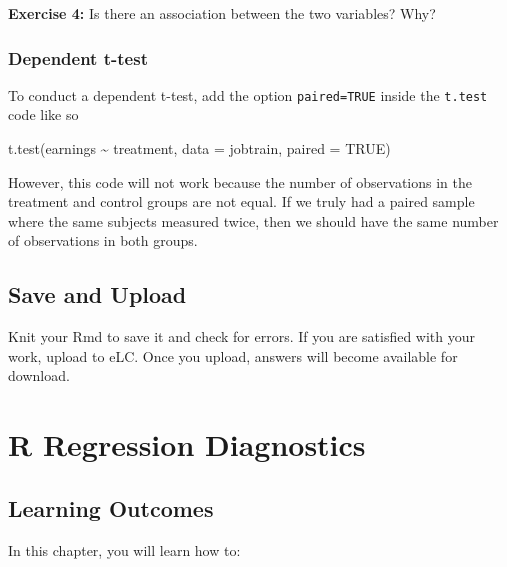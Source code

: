 \documentclass[
]{book}
\makeatletter
\newenvironment{Shaded}{\begin{snugshade}}{\end{snugshade}}
\newcommand{\AttributeTok}[1]{\textcolor[rgb]{0.61,0.61,0.61}{#1}}
\newcommand{\ConstantTok}[1]{\textcolor[rgb]{0,0,0}{#1}}
\newcommand{\FunctionTok}[1]{\textcolor[rgb]{0,0,0}{#1}}
\newcommand{\NormalTok}[1]{#1}
\newcommand{\SpecialCharTok}[1]{\textcolor[rgb]{0,0,0}{#1}}
\newenvironment{kframe}{%
\medskip{}
\setlength{\fboxsep}{.8em}
 \def\at@end@of@kframe{}%
 \ifinner\ifhmode%
  \def\at@end@of@kframe{\end{minipage}}%
  \begin{minipage}{\columnwidth}%
 \fi\fi%
 \def\FrameCommand##1{\hskip\@totalleftmargin \hskip-\fboxsep
 \colorbox{shadecolor}{##1}\hskip-\fboxsep
     \hskip-\linewidth \hskip-\@totalleftmargin \hskip\columnwidth}%
 \MakeFramed {\advance\hsize-\width
   \@totalleftmargin\z@ \linewidth\hsize
   \@setminipage}}%
 {\par\unskip\endMakeFramed%
 \at@end@of@kframe}
\renewenvironment{Shaded}{\begin{kframe}}{\end{kframe}}
\newenvironment{rmdblock}[1]
  {\begin{shaded*}
  }
  {\end{shaded*}
  }
\newenvironment{learncheck}
  {\begin{rmdblock}{warning}}
  {\end{rmdblock}}
\makeatother
\begin{document}
\begin{learncheck}
\textbf{Exercise 4:} Is there an association between the two variables?
Why?
\end{learncheck}

\hypertarget{dependent-t-test}{%
\subsection{Dependent t-test}\label{dependent-t-test}}

To conduct a dependent t-test, add the option \texttt{paired=TRUE} inside the \texttt{t.test} code like so

\begin{Shaded}
\begin{Highlighting}[]
\FunctionTok{t.test}\NormalTok{(earnings }\SpecialCharTok{\textasciitilde{}}\NormalTok{ treatment, }\AttributeTok{data =}\NormalTok{ jobtrain, }\AttributeTok{paired =} \ConstantTok{TRUE}\NormalTok{)}
\end{Highlighting}
\end{Shaded}

However, this code will not work because the number of observations in the treatment and control groups are not equal. If we truly had a paired sample where the same subjects measured twice, then we should have the same number of observations in both groups.

\hypertarget{save-and-upload}{%
\section{Save and Upload}\label{save-and-upload}}

Knit your Rmd to save it and check for errors. If you are satisfied with your work, upload to eLC. Once you upload, answers will become available for download.

\hypertarget{r-regression-diagnostics}{%
\chapter{R Regression Diagnostics}\label{r-regression-diagnostics}}

\hypertarget{learning-outcomes}{%
\section{Learning Outcomes}\label{learning-outcomes}}

In this chapter, you will learn how to:
\end{document}
